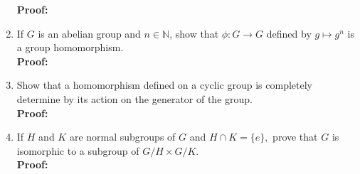 \documentclass[12pt]{article}
\newcommand{\bbN}{\mathbb{N}}
\begin{document}
\begin{enumerate}
\textbf{Proof:}
	\vfill
	
\item If $G$ is an abelian group and $n \in \bbN$, show that $\phi: G \to G$ defined by $g \mapsto g^n$ is a group homomorphism.\\

\textbf{Proof:}
	\vfill
\newpage
\item Show that a homomorphism defined on a cyclic group is completely determine by its action on the generator of the group. \\

\textbf{Proof:}
	\vfill
\item If $H$ and $K$ are normal subgroups of $G$ and $H \cap K=\{e\},$ prove that $G$ is isomorphic to a subgroup of $G/H \times G/K.$\\

\textbf{Proof:}
	\vfill

\end{enumerate}
\end{document}

